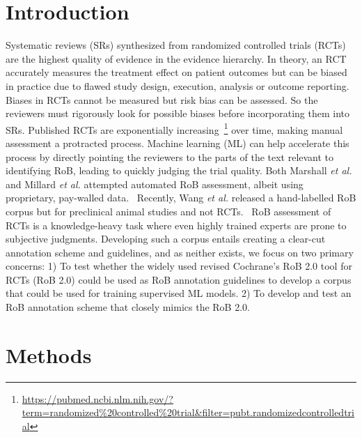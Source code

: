 \documentclass{IOS-Book-Article}
\begin{document}
\section{Introduction}
\label{sec:intro}
%
Systematic reviews (SRs) synthesized from randomized controlled trials (RCTs) are the highest quality of evidence in the evidence hierarchy.
In theory, an RCT accurately measures the treatment effect on patient outcomes but can be biased in practice due to flawed study design, execution, analysis or outcome reporting.~\cite{hariton2018randomised}
Biases in RCTs cannot be measured but risk bias can be assessed.
So the reviewers must rigorously look for possible biases before incorporating them into SRs.
Published RCTs are exponentially increasing~\footnote{\url{https://pubmed.ncbi.nlm.nih.gov/?term=randomized\%20controlled\%20trial&filter=pubt.randomizedcontrolledtrial}} over time, making manual assessment a protracted process.
Machine learning (ML) can help accelerate this process by directly pointing the reviewers to the parts of the text relevant to identifying RoB, leading to quickly judging the trial quality.
Both Marshall \textit{et al.} and Millard \textit{et al.} attempted automated RoB assessment, albeit using proprietary, pay-walled data.~\cite{marshall2015automating,millard2016machine}
Recently, Wang \textit{et al.} released a hand-labelled RoB corpus but for preclinical animal studies and not RCTs.~\cite{wang2022risk}
RoB assessment of RCTs is a knowledge-heavy task where even highly trained experts are prone to subjective judgments.
Developing such a corpus entails creating a clear-cut annotation scheme and guidelines, and as neither exists, we focus on two primary concerns:
1) To test whether the widely used revised Cochrane's RoB 2.0 tool for RCTs (RoB 2.0) could be used as RoB annotation guidelines to develop a corpus that could be used for training supervised ML models.
2) To develop and test an RoB annotation scheme that closely mimics the RoB 2.0.~\cite{lansbury2020co,sterne2019rob}
%
%
%
\section{Methods}
\label{sec:methods}
%
\end{document}
